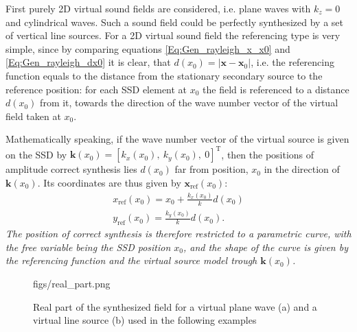 \documentclass[12pt,a4paper]{article}
\newcommand{\vx}{\mathbf{x}}
\newcommand{\vxo}{\mathbf{x}_0}
\begin{document}
First purely 2D virtual sound fields are considered, i.e. plane waves with $k_z=0$ and cylindrical waves. Such a sound field could be perfectly synthesized by a set of vertical line sources.
For a 2D virtual sound field the referencing type is very simple, since by comparing equations \ref{Eq:Gen_rayleigh_x_x0} and \eqref{Eq:Gen_rayleigh_dx0} it is clear, that $d(x_0) = |\vx-\vxo|$, i.e. the referencing function equals to the distance from the stationary secondary source to the reference position: for each SSD element at $x_0$ the field is referenced to a distance $d(x_0)$ from it, towards the direction of the wave number vector of the virtual field taken at $x_0$.

Mathematically speaking, if the wave number vector of the virtual source is given on the SSD by $\mathbf{k}(x_0) = [k_x(x_0),\ k_y(x_0),\ 0]^{\mathrm{T}}$, then the positions of amplitude correct synthesis lies $d(x_0)$ far from position, $x_0$ in the direction of $\mathbf{k}(x_0)$. Its coordinates are thus given by $\mathbf{x}_{\mathrm{ref}}(x_0)$:
\begin{eqnarray}
x_{\mathrm{ref}}(x_0) = x_0 + \frac{k_x(x_0)}{k} d(x_0) \\
y_{\mathrm{ref}}(x_0) = \frac{k_y(x_0)}{k} d(x_0).
\end{eqnarray}
\emph{The position of correct synthesis is therefore restricted to a parametric curve, with the free variable being the SSD position $x_0$, and the shape of the curve is given by the referencing function and the virtual source model trough $\mathbf{k}(x_0)$.}

\begin{figure}
	\centering
	\begin{overpic}[width = 1\columnwidth ]{figs/real_part.png}
	\scriptsize
	\end{overpic}
\caption{Real part of the synthesized field for a virtual plane wave (a) and a virtual line source (b) used in the following examples}
	\label{Fig:Theory:Real_part}
\end{figure}
\end{document}

